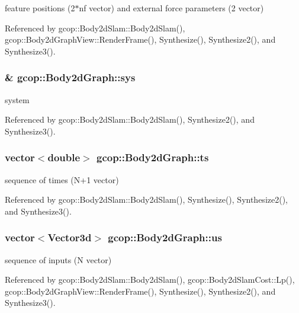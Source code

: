 feature positions (2$\ast$nf vector) and external force parameters (2 vector) 



\-Referenced by gcop\-::\-Body2d\-Slam\-::\-Body2d\-Slam(), gcop\-::\-Body2d\-Graph\-View\-::\-Render\-Frame(), \-Synthesize(), \-Synthesize2(), and \-Synthesize3().

\subsubsection[{sys}]{\& {\bf gcop\-::\-Body2d\-Graph\-::sys}}\label{classgcop_1_1Body2dGraph_a2c5b65e489d626795ab9c652ddf6bfd1}


system 



\-Referenced by gcop\-::\-Body2d\-Slam\-::\-Body2d\-Slam(), \-Synthesize2(), and \-Synthesize3().

\subsubsection[{ts}]{\setlength{\rightskip}{0pt plus 5cm}vector$<$double$>$ {\bf gcop\-::\-Body2d\-Graph\-::ts}}\label{classgcop_1_1Body2dGraph_a9cd015bda6c3fc023fa2524705067480}


sequence of times (\-N+1 vector) 



\-Referenced by gcop\-::\-Body2d\-Slam\-::\-Body2d\-Slam(), \-Synthesize(), \-Synthesize2(), and \-Synthesize3().

\subsubsection[{us}]{\setlength{\rightskip}{0pt plus 5cm}vector$<$\-Vector3d$>$ {\bf gcop\-::\-Body2d\-Graph\-::us}}\label{classgcop_1_1Body2dGraph_a907d1bad5b6991a3067773c8fa0e9ab6}


sequence of inputs (\-N vector) 



\-Referenced by gcop\-::\-Body2d\-Slam\-::\-Body2d\-Slam(), gcop\-::\-Body2d\-Slam\-Cost\-::\-Lp(), gcop\-::\-Body2d\-Graph\-View\-::\-Render\-Frame(), \-Synthesize(), \-Synthesize2(), and \-Synthesize3().

